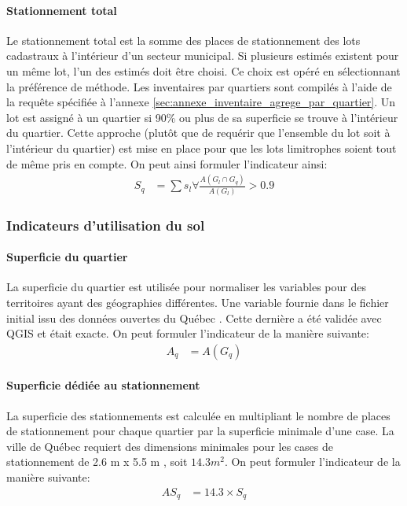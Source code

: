             \paragraph{Stationnement total} Le stationnement total est la somme des places de stationnement des lots cadastraux à l'intérieur d'un secteur municipal. Si plusieurs estimés existent pour un même lot, l'un des estimés doit être choisi. Ce choix est opéré en sélectionnant la préférence de méthode. Les inventaires par quartiers sont compilés à l'aide de la requête spécifiée à l'annexe \ref{sec:annexe_inventaire_agrege_par_quartier}. Un lot est assigné à un quartier si 90\% ou plus de sa superficie se trouve à l'intérieur du quartier. Cette approche (plutôt que de requérir que l'ensemble du lot soit à l'intérieur du quartier) est mise en place pour que les lots limitrophes soient tout de même pris en compte. On peut ainsi formuler l'indicateur ainsi:
    \begin{align}
        S_q &= \sum{s_l} \forall \frac{A\left(G_l\cap G_q\right)}{A\left(G_l\right)}>0.9
    \end{align}
        \subsubsection{Indicateurs d'utilisation du sol}
            \paragraph{Superficie du quartier} La superficie du quartier est utilisée pour normaliser les variables pour des territoires ayant des géographies différentes. Une variable fournie dans le fichier initial issu des données ouvertes du Québec \parencite{ville_de_quebec_quartiers_2024}. Cette dernière a été validée avec QGIS et était exacte. On peut formuler l'indicateur de la manière suivante:
            \begin{align}
                A_q &= A(G_q)
            \end{align}
            \paragraph{Superficie dédiée au stationnement} La superficie des stationnements est calculée en multipliant le nombre de places de stationnement pour chaque quartier par la superficie minimale d'une case. La ville de Québec requiert des dimensions minimales pour les cases de stationnement de 2.6 m x 5.5 m \parencite{ville_de_quebec_normes_2024,ville_de_quebec_normes_2024-1,ville_de_quebec_normes_2024-2,ville_de_quebec_normes_2025,ville_de_quebec_reglement_2009-1}, soit $14.3m^2$. On peut formuler l'indicateur de la manière suivante:
            \begin{align}
                AS_q &= 14.3 \times S_q
            \end{align}
